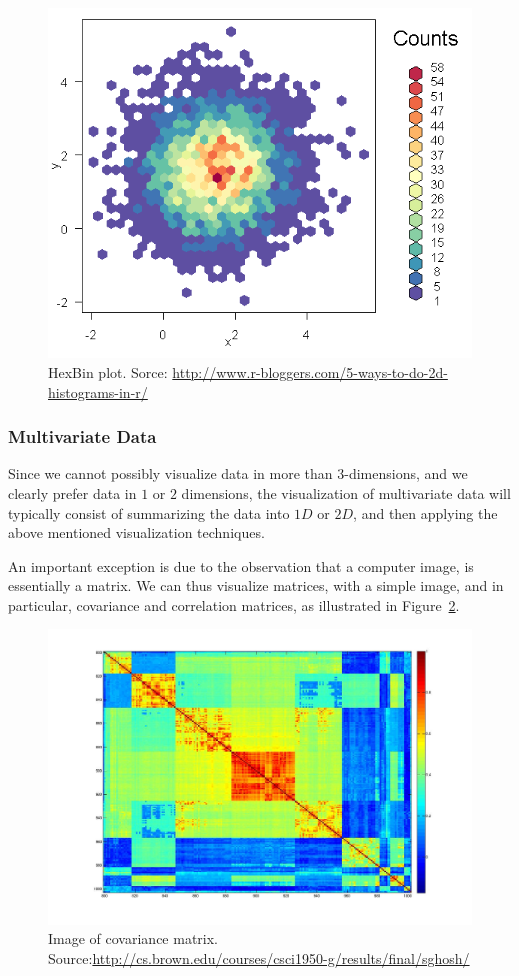 \documentclass[12pt,a4paper]{report}
\begin{document}
\begin{figure}
\centering
\includegraphics[width=0.7\linewidth]{art/hexbin2}
\caption[HexBin Plot]{HexBin plot. Sorce: \url{http://www.r-bloggers.com/5-ways-to-do-2d-histograms-in-r/}}
\label{fig:hexbin}
\end{figure}


\subsubsection{Multivariate Data}
Since we cannot possibly visualize data in more than $3$-dimensions, and we clearly prefer data in $1$ or $2$ dimensions, the visualization of multivariate data will typically consist of summarizing the data into $1D$ or $2D$, and then applying the above mentioned visualization techniques.

An important exception is due to the observation that a computer image, is essentially a matrix. 
We can thus visualize matrices, with a simple image, and in particular, covariance and correlation matrices, as illustrated in Figure~\ref{fig:covariance_image}.

\begin{figure}
\centering
\includegraphics[width=0.7\linewidth]{art/covarianceSupervised}
\caption[Covariance Matrix]{Image of covariance matrix. Source:\url{http://cs.brown.edu/courses/csci1950-g/results/final/sghosh/}}
\label{fig:covariance_image}
\end{figure}
\end{document}
